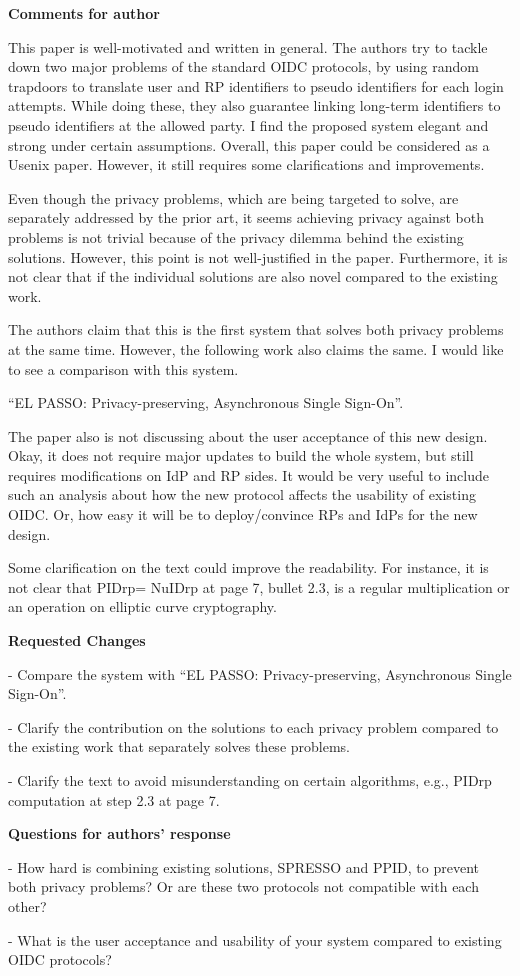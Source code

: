 \documentclass[letterpaper,onecolumn,10pt]{article}
\begin{document}
\vspace{1mm}\noindent\textbf{Comments for author}


This paper is well-motivated and written in general. The authors try to tackle down two major problems of the standard OIDC protocols, by using random trapdoors to translate user and RP identifiers to pseudo identifiers for each login attempts. While doing these, they also guarantee linking long-term identifiers to pseudo identifiers at the allowed party. I find the proposed system elegant and strong under certain assumptions. Overall, this paper could be considered as a Usenix paper. However, it still requires some clarifications and improvements.

Even though the privacy problems, which are being targeted to solve, are separately addressed by the prior art, it seems achieving privacy against both problems is not trivial because of the privacy dilemma behind the existing solutions. However, this point is not well-justified in the paper. Furthermore, it is not clear that if the individual solutions are also novel compared to the existing work.

The authors claim that this is the first system that solves both privacy problems at the same time. However, the following work also claims the same. I would like to see a comparison with this system.

“EL PASSO: Privacy-preserving, Asynchronous Single Sign-On”.

The paper also is not discussing about the user acceptance of this new design. Okay, it does not require major updates to build the whole system, but still requires modifications on IdP and RP sides. It would be very useful to include such an analysis about how the new protocol affects the usability of existing OIDC. Or, how easy it will be to deploy/convince RPs and IdPs for the new design.

Some clarification on the text could improve the readability. For instance, it is not clear that PIDrp= NuIDrp at page 7, bullet 2.3, is a regular multiplication or an operation on elliptic curve cryptography.

\vspace{1mm}\noindent\textbf{Requested Changes}


-	Compare the system with “EL PASSO: Privacy-preserving, Asynchronous Single Sign-On”.

-	Clarify the contribution on the solutions to each privacy problem compared to the existing work that separately solves these problems.

-	Clarify the text to avoid misunderstanding on certain algorithms, e.g., PIDrp computation at step 2.3 at page 7.

\vspace{1mm}\noindent\textbf{Questions for authors' response}


-	How hard is combining existing solutions, SPRESSO and PPID, to prevent both privacy problems? Or are these two protocols not compatible with each other?

-	What is the user acceptance and usability of your system compared to existing OIDC protocols?
\end{document}
